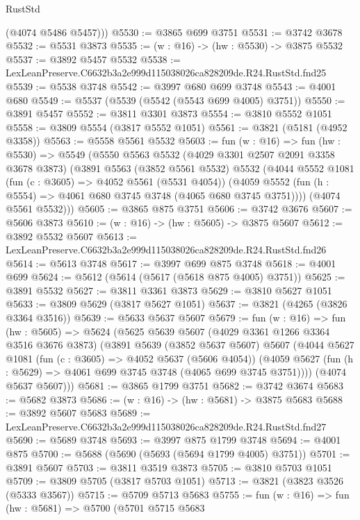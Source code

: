 \begin{lexlean}{RustStd}
\begin{coremodule}
        (@4074 @5486 @5457)))
@5530 := @3865 @699 @3751
@5531 := @3742 @3678
@5532 := @5531 @3873
@5535 := (w : @16) -> (hw : @5530) -> @3875 @5532
@5537 := @3892 @5457 @5532
@5538 := LexLeanPreserve.C6632b3a2e999d115038026ca828209de.R24.RustStd.fnd25
@5539 := @5538 @3748
@5542 := @3997 @680 @699 @3748
@5543 := @4001 @680
@5549 := @5537 (@5539 (@5542 (@5543 @699 @4005) @3751))
@5550 := @3891 @5457
@5552 := @3811 @3301 @3873
@5554 := @3810 @5552 @1051
@5558 := @3809 @5554 (@3817 @5552 @1051)
@5561 := @3821 (@5181 (@4952 @3358))
@5563 := @5558 @5561 @5532
@5603 := fun (w : @16) =>
  fun (hw : @5530) =>
  @5549
    (@5550
      @5563
      @5532
      (@4029 @3301 @2507 @2091 @3358 @3678 @3873)
      (@3891
        @5563
        (@3852 @5561 @5532)
        @5532
        (@4044
          @5552
          @1081
          (fun (c : @3605) => @4052 @5561 (@5531 @4054))
          (@4059 @5552 (fun (h : @5554) => @4061 @680 @3745 @3748 (@4065 @680 @3745 @3751))))
        (@4074 @5561 @5532)))
@5605 := @3865 @875 @3751
@5606 := @3742 @3676
@5607 := @5606 @3873
@5610 := (w : @16) -> (hw : @5605) -> @3875 @5607
@5612 := @3892 @5532 @5607
@5613 := LexLeanPreserve.C6632b3a2e999d115038026ca828209de.R24.RustStd.fnd26
@5614 := @5613 @3748
@5617 := @3997 @699 @875 @3748
@5618 := @4001 @699
@5624 := @5612 (@5614 (@5617 (@5618 @875 @4005) @3751))
@5625 := @3891 @5532
@5627 := @3811 @3361 @3873
@5629 := @3810 @5627 @1051
@5633 := @3809 @5629 (@3817 @5627 @1051)
@5637 := @3821 (@4265 (@3826 @3364 @3516))
@5639 := @5633 @5637 @5607
@5679 := fun (w : @16) =>
  fun (hw : @5605) =>
  @5624
    (@5625
      @5639
      @5607
      (@4029 @3361 @1266 @3364 @3516 @3676 @3873)
      (@3891
        @5639
        (@3852 @5637 @5607)
        @5607
        (@4044
          @5627
          @1081
          (fun (c : @3605) => @4052 @5637 (@5606 @4054))
          (@4059 @5627 (fun (h : @5629) => @4061 @699 @3745 @3748 (@4065 @699 @3745 @3751))))
        (@4074 @5637 @5607)))
@5681 := @3865 @1799 @3751
@5682 := @3742 @3674
@5683 := @5682 @3873
@5686 := (w : @16) -> (hw : @5681) -> @3875 @5683
@5688 := @3892 @5607 @5683
@5689 := LexLeanPreserve.C6632b3a2e999d115038026ca828209de.R24.RustStd.fnd27
@5690 := @5689 @3748
@5693 := @3997 @875 @1799 @3748
@5694 := @4001 @875
@5700 := @5688 (@5690 (@5693 (@5694 @1799 @4005) @3751))
@5701 := @3891 @5607
@5703 := @3811 @3519 @3873
@5705 := @3810 @5703 @1051
@5709 := @3809 @5705 (@3817 @5703 @1051)
@5713 := @3821 (@3823 @3526 (@5333 @3567))
@5715 := @5709 @5713 @5683
@5755 := fun (w : @16) =>
  fun (hw : @5681) =>
  @5700
    (@5701
      @5715
      @5683

\end{coremodule}
\end{lexlean}

